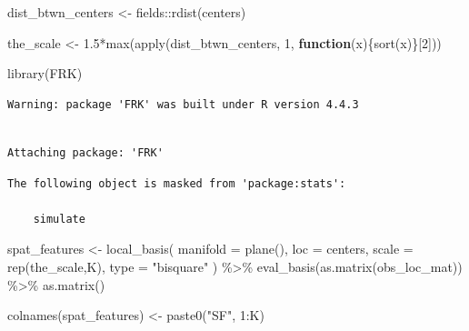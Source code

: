 \documentclass[
  letterpaper,
  DIV=11,
  numbers=noendperiod]{scrartcl}
\newenvironment{Shaded}{\begin{snugshade}}{\end{snugshade}}
\newcommand{\AttributeTok}[1]{\textcolor[rgb]{0.40,0.45,0.13}{#1}}
\newcommand{\ControlFlowTok}[1]{\textcolor[rgb]{0.00,0.23,0.31}{\textbf{#1}}}
\newcommand{\DecValTok}[1]{\textcolor[rgb]{0.68,0.00,0.00}{#1}}
\newcommand{\FloatTok}[1]{\textcolor[rgb]{0.68,0.00,0.00}{#1}}
\newcommand{\FunctionTok}[1]{\textcolor[rgb]{0.28,0.35,0.67}{#1}}
\newcommand{\NormalTok}[1]{\textcolor[rgb]{0.00,0.23,0.31}{#1}}
\newcommand{\OtherTok}[1]{\textcolor[rgb]{0.00,0.23,0.31}{#1}}
\newcommand{\SpecialCharTok}[1]{\textcolor[rgb]{0.37,0.37,0.37}{#1}}
\newcommand{\StringTok}[1]{\textcolor[rgb]{0.13,0.47,0.30}{#1}}
\begin{document}
\begin{Shaded}
\begin{Highlighting}[]
\NormalTok{dist\_btwn\_centers }\OtherTok{\textless{}{-}}\NormalTok{ fields}\SpecialCharTok{::}\FunctionTok{rdist}\NormalTok{(centers)}

\NormalTok{the\_scale }\OtherTok{\textless{}{-}} \FloatTok{1.5}\SpecialCharTok{*}\FunctionTok{max}\NormalTok{(}\FunctionTok{apply}\NormalTok{(dist\_btwn\_centers, }\DecValTok{1}\NormalTok{, }\ControlFlowTok{function}\NormalTok{(x)\{}\FunctionTok{sort}\NormalTok{(x)\}[}\DecValTok{2}\NormalTok{]))}
\end{Highlighting}
\end{Shaded}

\begin{Shaded}
\begin{Highlighting}[]
\FunctionTok{library}\NormalTok{(FRK)}
\end{Highlighting}
\end{Shaded}

\begin{verbatim}
Warning: package 'FRK' was built under R version 4.4.3
\end{verbatim}

\begin{verbatim}

Attaching package: 'FRK'
\end{verbatim}

\begin{verbatim}
The following object is masked from 'package:stats':

    simulate
\end{verbatim}

\begin{Shaded}
\begin{Highlighting}[]
\NormalTok{spat\_features }\OtherTok{\textless{}{-}} \FunctionTok{local\_basis}\NormalTok{(}
  \AttributeTok{manifold =} \FunctionTok{plane}\NormalTok{(),}
  \AttributeTok{loc =}\NormalTok{ centers,}
  \AttributeTok{scale =} \FunctionTok{rep}\NormalTok{(the\_scale,K),}
  \AttributeTok{type =} \StringTok{"bisquare"}
\NormalTok{) }\SpecialCharTok{\%\textgreater{}\%}
  \FunctionTok{eval\_basis}\NormalTok{(}\FunctionTok{as.matrix}\NormalTok{(obs\_loc\_mat)) }\SpecialCharTok{\%\textgreater{}\%}
  \FunctionTok{as.matrix}\NormalTok{()}

\FunctionTok{colnames}\NormalTok{(spat\_features) }\OtherTok{\textless{}{-}} \FunctionTok{paste0}\NormalTok{(}\StringTok{"SF"}\NormalTok{, }\DecValTok{1}\SpecialCharTok{:}\NormalTok{K)}
\end{Highlighting}
\end{Shaded}
\end{document}
